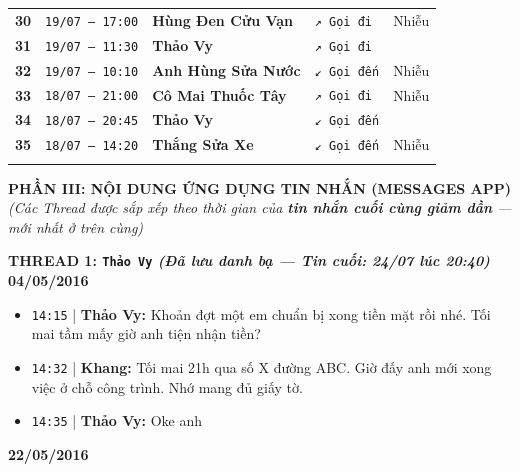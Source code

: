 \documentclass[12pt,a4paper]{article}
\begin{document}
\begin{xltabular}{\textwidth}{>{\hsize}X >{\hsize}X >{\hsize}X >{\hsize}X >{\hsize}X}
\textbf{30} & \texttt{19/07 — 17:00} & \textbf{Hùng Đen Cửu Vạn} & \texttt{↗ Gọi đi} & Nhiễu \\ \addlinespace[4pt]
\textbf{31} & \texttt{19/07 — 11:30} & \textbf{Thảo Vy} & \texttt{↗ Gọi đi} &  \\ \addlinespace[4pt]
\textbf{32} & \texttt{19/07 — 10:10} & \textbf{Anh Hùng Sửa Nước} & \texttt{↙ Gọi đến} & Nhiễu \\ \addlinespace[4pt]
\textbf{33} & \texttt{18/07 — 21:00} & \textbf{Cô Mai Thuốc Tây} & \texttt{↗ Gọi đi} & Nhiễu \\ \addlinespace[4pt]
\textbf{34} & \texttt{18/07 — 20:45} & \textbf{Thảo Vy} & \texttt{↙ Gọi đến} &  \\ \addlinespace[4pt]
\textbf{35} & \texttt{18/07 — 14:20} & \textbf{Thắng Sửa Xe} & \texttt{↙ Gọi đến} & Nhiễu \\ \addlinespace[4pt]
\end{xltabular}
\endgroup

\vspace{0.2cm}



\vspace{0.35cm}\noindent\textbf{\large  PHẦN III: NỘI DUNG ỨNG DỤNG TIN NHẮN (MESSAGES APP)}\\[0.15cm]

\textit{(Các Thread được sắp xếp theo thời gian của \textbf{tin nhắn cuối cùng giảm dần} — mới nhất ở trên cùng)}




\vspace{0.3cm}\noindent\textbf{\large  THREAD 1: \texttt{Thảo Vy} \textit{(Đã lưu danh bạ — Tin cuối: 24/07 lúc 20:40)}}\\[0.15cm]


\textbf{04/05/2016}

\begin{itemize}[leftmargin=*, itemsep=2pt, topsep=2pt, parsep=0pt]
  \item \texttt{14:15} | \textbf{Thảo Vy:} Khoản đợt một em chuẩn bị xong tiền mặt rồi nhé. Tối mai tầm mấy giờ anh tiện nhận tiền?
  \item \texttt{14:32} | \textbf{Khang:} Tối mai 21h qua số X đường ABC. Giờ đấy anh mới xong việc ở chỗ công trình. Nhớ mang đủ giấy tờ.
  \item \texttt{14:35} | \textbf{Thảo Vy:} Oke anh

\end{itemize}
\textbf{22/05/2016}
\end{document}
